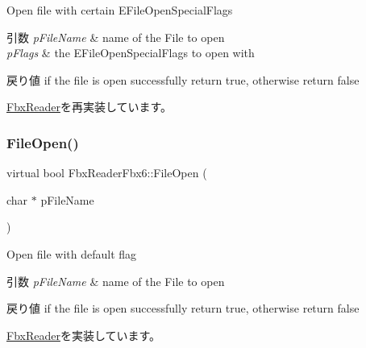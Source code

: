 Open file with certain E\+File\+Open\+Special\+Flags 
\begin{DoxyParams}{引数}
{\em p\+File\+Name} & name of the File to open \\
\hline
{\em p\+Flags} & the E\+File\+Open\+Special\+Flags to open with \\
\hline
\end{DoxyParams}
\begin{DoxyReturn}{戻り値}
if the file is open successfully return true, otherwise return false 
\end{DoxyReturn}


\hyperlink{class_fbx_reader_a345b292805ea8799a9d962714e1ad9a5}{Fbx\+Reader}を再実装しています。

\mbox{\label{class_fbx_reader_fbx6_aae8a88d85353be67413ce60a27873422}} 
\subsubsection{\texorpdfstring{File\+Open()}{FileOpen()}\hspace{0.1cm}{\footnotesize\ttfamily [2/4]}}
{\footnotesize\ttfamily virtual bool Fbx\+Reader\+Fbx6\+::\+File\+Open (\begin{DoxyParamCaption}\item[{char $\ast$}]{p\+File\+Name }\end{DoxyParamCaption})\hspace{0.3cm}{\ttfamily [virtual]}}

Open file with default flag 
\begin{DoxyParams}{引数}
{\em p\+File\+Name} & name of the File to open \\
\hline
\end{DoxyParams}
\begin{DoxyReturn}{戻り値}
if the file is open successfully return {\ttfamily true}, otherwise return {\ttfamily false} 
\end{DoxyReturn}


\hyperlink{class_fbx_reader_a6105bd37ae86c03f35aee6f62901856d}{Fbx\+Reader}を実装しています。

\mbox{\label{class_fbx_reader_fbx6_a9f3d0e6b7722581f2028be9b94f1b933}} 
